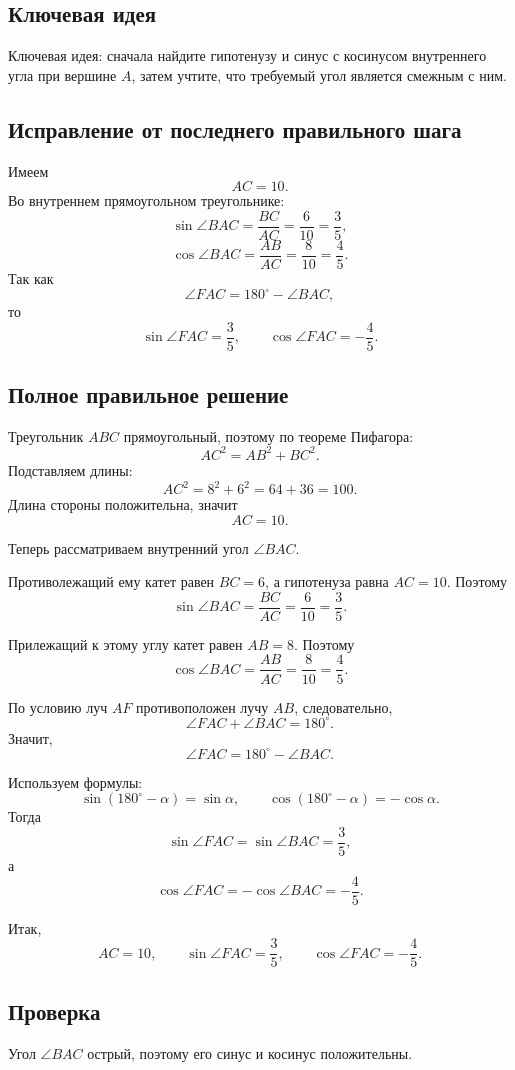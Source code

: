 \documentclass[12pt,a4paper]{article}
\begin{document}
\subsection*{Ключевая идея}
\textcolor{blue!60!black}{Ключевая идея:} сначала найдите гипотенузу и синус с косинусом внутреннего угла при вершине $A$, затем учтите, что требуемый угол является смежным с ним.

\subsection*{Исправление от последнего правильного шага}
Имеем
\[
AC=10.
\]
Во внутреннем прямоугольном треугольнике:
\[
\sin\angle BAC=\frac{BC}{AC}=\frac6{10}=\frac35,
\]
\[
\cos\angle BAC=\frac{AB}{AC}=\frac8{10}=\frac45.
\]
Так как
\[
\angle FAC=180^\circ-\angle BAC,
\]
то
\[
\sin\angle FAC=\frac35,
\qquad
\cos\angle FAC=-\frac45.
\]

\subsection*{Полное правильное решение}
Треугольник $ABC$ прямоугольный, поэтому по теореме Пифагора:
\[
AC^2=AB^2+BC^2.
\]
Подставляем длины:
\[
AC^2=8^2+6^2=64+36=100.
\]
Длина стороны положительна, значит
\[
AC=10.
\]

Теперь рассматриваем внутренний угол $\angle BAC$.

Противолежащий ему катет равен $BC=6$, а гипотенуза равна $AC=10$. Поэтому
\[
\sin\angle BAC=\frac{BC}{AC}=\frac6{10}=\frac35.
\]

Прилежащий к этому углу катет равен $AB=8$. Поэтому
\[
\cos\angle BAC=\frac{AB}{AC}=\frac8{10}=\frac45.
\]

По условию луч $AF$ противоположен лучу $AB$, следовательно,
\[
\angle FAC+\angle BAC=180^\circ.
\]
Значит,
\[
\angle FAC=180^\circ-\angle BAC.
\]

Используем формулы:
\[
\sin(180^\circ-\alpha)=\sin\alpha,
\qquad
\cos(180^\circ-\alpha)=-\cos\alpha.
\]
Тогда
\[
\sin\angle FAC=\sin\angle BAC=\frac35,
\]
а
\[
\cos\angle FAC=-\cos\angle BAC=-\frac45.
\]

Итак,
\[
\boxed{AC=10,\qquad
\sin\angle FAC=\frac35,\qquad
\cos\angle FAC=-\frac45}.
\]

\subsection*{Проверка}
Угол $\angle BAC$ острый, поэтому его синус и косинус положительны.
\end{document}
